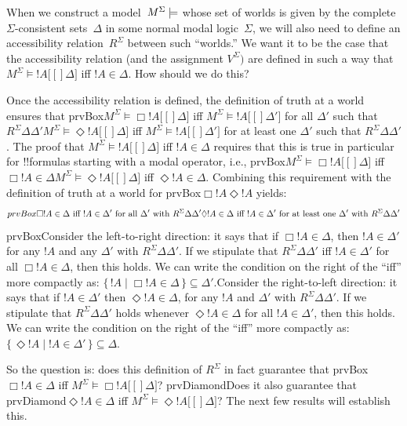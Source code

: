\documentclass[10pt,a4paper]{article}
\theoremstyle{plain}
\theoremstyle{definition}
\theoremstyle{remark}
\newenvironment{explain}{}{}
\providecommand{\mSat}[3]{\ensuremath{#1 \models #2[#3]}}
\providecommand{\mModel}[2]{\ensuremath{#1 \models #2}}
\providecommand{\iftag}[1]{#1}
\providecommand{\Setabs}[2]{\{\, #1 \mid #2 \,\}}
\providecommand{\iftag}{}
\begin{document}
\begin{explain}
When we construct a model~$\mModel{M^\Sigma}$ whose set of worlds is
given by the complete $\Sigma$-consistent sets~$\Delta$ in some normal
modal logic~$\Sigma$, we will also need to define an accessibility
relation~$R^\Sigma$ between such ``worlds.'' We want it to be the case
that the accessibility relation (and the assignment $V^\Sigma)$ are
defined in such a way that $\mSat{M^\Sigma}{!A}[\Delta]$ iff $!A \in
\Delta$. How should we do this?

Once the accessibility relation is defined, the definition of truth at
a world ensures that \iftag{prvBox}{$\mSat{M^\Sigma}{\Box!A}[\Delta]$
  iff $\mSat{M^\Sigma}{!A}[\Delta']$ for all $\Delta'$ such that
  $R^\Sigma\Delta\Delta'$}{$\mSat{M^\Sigma}{\Diamond!A}[\Delta]$ iff
  $\mSat{M^\Sigma}{!A}[\Delta']$ for at least one $\Delta'$ such that
  $R^\Sigma\Delta\Delta'$}.  The proof that
$\mSat{M^\Sigma}{!A}[\Delta]$ iff $!A \in \Delta$ requires that this
is true in particular for !!{formula}s starting with a modal operator,
i.e., \iftag{prvBox}{$\mSat{M^\Sigma}{\Box!A}[\Delta]$ iff $\Box !A
  \in \Delta$}{$\mSat{M^\Sigma}{\Diamond!A}[\Delta]$ iff $\Diamond !A
  \in \Delta$}. Combining this requirement with the definition of
truth at a world for \iftag{prvBox}{$\Box !A$}{$\Diamond !A$} yields:
\[
\iftag{prvBox}{%
  \Box!A \in \Delta \text{ iff } !A \in \Delta' \text{
    for all $\Delta'$ with } R^\Sigma\Delta\Delta'}{%
  \Diamond!A \in \Delta \text{ iff } !A \in \Delta' \text{ for at
    least one } \Delta' \text{ with } R^\Sigma\Delta\Delta'}
\]
\iftag{prvBox}{Consider the left-to-right direction: it says that if
  $\Box !A \in \Delta$, then $!A \in \Delta'$ for any $!A$ and any
  $\Delta'$ with $R^\Sigma\Delta\Delta'$. If we stipulate that
  $R^\Sigma\Delta\Delta'$ iff $!A \in \Delta'$ for all $\Box!A \in
  \Delta$, then this holds. We can write the condition on the right of
  the ``iff'' more compactly as: $\Setabs{!A}{\Box!A \in \Delta}
  \subseteq \Delta'$.}{Consider the right-to-left direction: it says
  that if $!A \in \Delta'$ then $\Diamond!A \in \Delta$, for any $!A$
  and $\Delta'$ with $R^\Sigma\Delta\Delta'$. If we stipulate that
  $R^\Sigma\Delta\Delta'$ holds whenever $\Diamond!A \in \Delta$ for
  all $!A \in \Delta'$, then this holds.  We can write the condition
  on the right of the ``iff'' more compactly as:
  $\Setabs{\Diamond!A}{!A \in \Delta'} \subseteq \Delta$.}

So the question is: does this definition of $R^\Sigma$ in fact
guarantee that \iftag{prvBox}{$\Box !A \in \Delta$ iff
  $\mSat{M^\Sigma}{\Box !A}[\Delta]$? \iftag{prvDiamond}{Does it also
    guarantee that }{}}{}\iftag{prvDiamond}{$\Diamond !A \in \Delta$
  iff $\mSat{M^\Sigma}{\Diamond !A}[\Delta]$?}{} The next few results
will establish this.
\end{explain}
\end{document}
